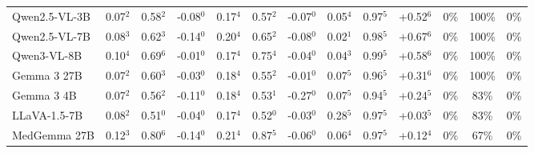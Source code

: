 \documentclass{article}
\begin{document}
\begin{table}[t]
{\begin{tabular}{l@{\hspace{3pt}}ccc@{\hspace{4pt}}ccc@{\hspace{4pt}}ccc@{\hspace{4pt}}ccc}
Qwen2.5-VL-3B & \cellcolor{cfSage2}0.07$^{2}$ & \cellcolor{cfSage1}0.58$^{2}$ & \cellcolor{cfSlate2}-0.08$^{0}$ & \cellcolor{cfSage3}0.17$^{4}$ & \cellcolor{cfSage1}0.57$^{2}$ & \cellcolor{cfSlate2}-0.07$^{0}$ & \cellcolor{cfSage1}0.05$^{4}$ & \cellcolor{cfSage4}0.97$^{5}$ & \cellcolor{cfTerra4}+0.52$^{6}$ & \cellcolor{cfTerra1}0\% & \cellcolor{cfTerra4}100\% & 0\% \\
Qwen2.5-VL-7B & \cellcolor{cfSage2}0.08$^{3}$ & \cellcolor{cfSage2}0.62$^{3}$ & \cellcolor{cfSlate3}-0.14$^{0}$ & \cellcolor{cfSage3}0.20$^{4}$ & \cellcolor{cfSage2}0.65$^{2}$ & \cellcolor{cfSlate2}-0.08$^{0}$ & \cellcolor{cfSage1}0.02$^{1}$ & \cellcolor{cfSage4}0.98$^{5}$ & \cellcolor{cfTerra4}+0.67$^{6}$ & \cellcolor{cfTerra1}0\% & \cellcolor{cfTerra4}100\% & 0\% \\
Qwen3-VL-8B & \cellcolor{cfSage2}0.10$^{4}$ & \cellcolor{cfSage2}0.69$^{6}$ & \cellcolor{cfSlate1}-0.01$^{0}$ & \cellcolor{cfSage3}0.17$^{4}$ & \cellcolor{cfSage2}0.75$^{4}$ & \cellcolor{cfSlate2}-0.04$^{0}$ & \cellcolor{cfSage1}0.04$^{3}$ & \cellcolor{cfSage4}0.99$^{5}$ & \cellcolor{cfTerra4}+0.58$^{6}$ & \cellcolor{cfTerra1}0\% & \cellcolor{cfTerra4}100\% & 0\% \\
Gemma 3 27B & \cellcolor{cfSage2}0.07$^{2}$ & \cellcolor{cfSage2}0.60$^{3}$ & \cellcolor{cfSlate2}-0.03$^{0}$ & \cellcolor{cfSage3}0.18$^{4}$ & \cellcolor{cfSage1}0.55$^{2}$ & \cellcolor{cfSlate1}-0.01$^{0}$ & \cellcolor{cfSage2}0.07$^{5}$ & \cellcolor{cfSage4}0.96$^{5}$ & \cellcolor{cfTerra4}+0.31$^{6}$ & \cellcolor{cfTerra1}0\% & \cellcolor{cfTerra4}100\% & 0\% \\
Gemma 3 4B & \cellcolor{cfSage2}0.07$^{2}$ & \cellcolor{cfSage1}0.56$^{2}$ & \cellcolor{cfSlate3}-0.11$^{0}$ & \cellcolor{cfSage3}0.18$^{4}$ & \cellcolor{cfSage1}0.53$^{1}$ & \cellcolor{cfSlate4}-0.27$^{0}$ & \cellcolor{cfSage2}0.07$^{5}$ & \cellcolor{cfSage4}0.94$^{5}$ & \cellcolor{cfTerra3}+0.24$^{5}$ & \cellcolor{cfTerra1}0\% & \cellcolor{cfTerra3}83\% & 0\% \\
LLaVA-1.5-7B & \cellcolor{cfSage2}0.08$^{2}$ & \cellcolor{cfSage1}0.51$^{0}$ & \cellcolor{cfSlate2}-0.04$^{0}$ & \cellcolor{cfSage3}0.17$^{4}$ & \cellcolor{cfSage1}0.52$^{0}$ & \cellcolor{cfSlate2}-0.03$^{0}$ & \cellcolor{cfSage4}0.28$^{5}$ & \cellcolor{cfSage4}0.97$^{5}$ & \cellcolor{cfTerra2}+0.03$^{5}$ & \cellcolor{cfTerra1}0\% & \cellcolor{cfTerra3}83\% & 0\% \\
MedGemma 27B & \cellcolor{cfSage3}0.12$^{3}$ & \cellcolor{cfSage3}0.80$^{6}$ & \cellcolor{cfSlate3}-0.14$^{0}$ & \cellcolor{cfSage4}0.21$^{4}$ & \cellcolor{cfSage3}0.87$^{5}$ & \cellcolor{cfSlate2}-0.06$^{0}$ & \cellcolor{cfSage2}0.06$^{4}$ & \cellcolor{cfSage4}0.97$^{5}$ & \cellcolor{cfTerra3}+0.12$^{4}$ & \cellcolor{cfTerra1}0\% & \cellcolor{cfTerra3}67\% & 0\% \\

\end{tabular}}
\end{table}
\end{document}
